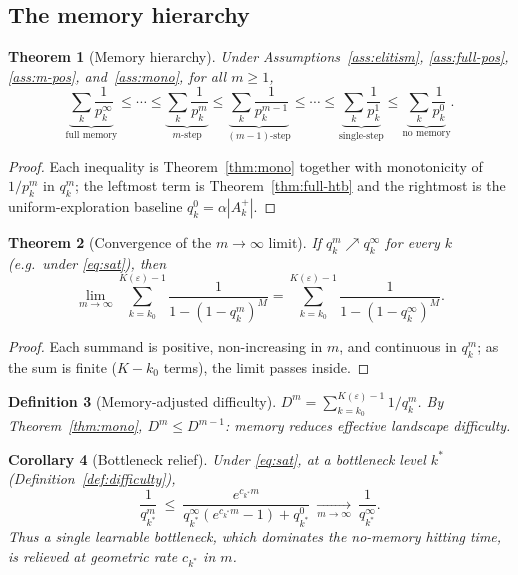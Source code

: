 \documentclass[11pt,a4paper]{article}
\newtheorem{theorem}{Theorem}[section]
\newtheorem{corollary}[theorem]{Corollary}
\newtheorem{definition}[theorem]{Definition}
\newcommand{\Akp}{A_k^{+}}
\begin{document}
\subsection{The memory hierarchy}
\label{sec:comparison}

\begin{theorem}[Memory hierarchy]\label{thm:hierarchy}
  Under Assumptions~\ref{ass:elitism}, \ref{ass:full-pos},
  \ref{ass:m-pos}, and~\ref{ass:mono}, for all $m\ge1$,
  \[
    \underbrace{\sum_k\frac1{p_k^\infty}}_{\text{full memory}}
    \le\cdots\le
    \underbrace{\sum_k\frac1{p_k^m}}_{m\text{-step}}
    \le
    \underbrace{\sum_k\frac1{p_k^{m-1}}}_{(m-1)\text{-step}}
    \le\cdots\le
    \underbrace{\sum_k\frac1{p_k^1}}_{\text{single-step}}
    \le
    \underbrace{\sum_k\frac1{p_k^0}}_{\text{no memory}} .
  \]
\end{theorem}

\begin{proof}
  Each inequality is Theorem~\ref{thm:mono} together with monotonicity of
  $1/p_k^m$ in $q_k^m$; the leftmost term is
  Theorem~\ref{thm:full-htb} and the rightmost is the
  uniform-exploration baseline $q_k^0=\alpha|\Akp|$.
\end{proof}

\begin{theorem}[Convergence of the $m\to\infty$ limit]\label{thm:limit}
  If $q_k^m\nearrow q_k^\infty$ for every $k$ (e.g.\ under
  \eqref{eq:sat}), then
  \[
    \lim_{m\to\infty}\sum_{k=k_0}^{K(\varepsilon)-1}\frac1{1-(1-q_k^m)^M}
    =\sum_{k=k_0}^{K(\varepsilon)-1}\frac1{1-(1-q_k^\infty)^M}.
  \]
\end{theorem}

\begin{proof}
  Each summand is positive, non-increasing in $m$, and continuous in
  $q_k^m$; as the sum is finite ($K-k_0$ terms), the limit passes inside.
\end{proof}

\begin{definition}[Memory-adjusted difficulty]
  $D^m=\sum_{k=k_0}^{K(\varepsilon)-1}1/q_k^m$.  By Theorem~\ref{thm:mono},
  $D^m\le D^{m-1}$: memory reduces effective landscape difficulty.
\end{definition}

\begin{corollary}[Bottleneck relief]\label{cor:bottleneck}
  Under \eqref{eq:sat}, at a bottleneck level $k^*$
  (Definition~\ref{def:difficulty}),
  \[
    \frac1{q_{k^*}^m}
    \ \le\
    \frac{e^{c_{k^*}m}}
         {q_{k^*}^\infty(e^{c_{k^*}m}-1)+q_{k^*}^0}
    \ \xrightarrow[m\to\infty]{}\ \frac1{q_{k^*}^\infty}.
  \]
  Thus a single learnable bottleneck, which dominates the no-memory
  hitting time, is relieved at geometric rate $c_{k^*}$ in $m$.
\end{corollary}
\end{document}
